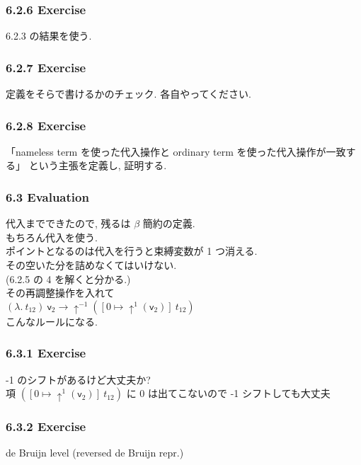 \documentclass[13pt,dvipdfm]{beamer}
\begin{document}
\frame
{
  \frametitle{6.2.6 Exercise}
  6.2.3 の結果を使う.
}

\frame
{
  \frametitle{6.2.7 Exercise}
  定義をそらで書けるかのチェック.
  各自やってください.
}

\frame
{
  \frametitle{6.2.8 Exercise}
  「nameless term を使った代入操作と ordinary term を使った代入操作が一致する」
  という主張を定義し, 証明する.

  
}

\frame
{
  \frametitle{6.3 Evaluation}
  代入までできたので, 残るは $\beta$ 簡約の定義.\\
  もちろん代入を使う.\\
  ポイントとなるのは代入を行うと束縛変数が 1 つ消える.\\
  その空いた分を詰めなくてはいけない.\\
  (6.2.5 の 4 を解くと分かる.)\\
  その再調整操作を入れて\\
  $(\lambda.\ t_{12})\ \mathsf{v}_2 \longrightarrow \uparrow^{-1} ([0 \mapsto \uparrow^{1} (\mathsf{v}_2)]\ t_{12})$\\
  こんなルールになる.
}

\frame
{
  \frametitle{6.3.1 Exercise}
  -1 のシフトがあるけど大丈夫か?\\
  項 $([0 \mapsto \uparrow^{1} (\mathsf{v}_2)]\ t_{12})$ に 0 は出てこないので -1 シフトしても大丈夫
}

\frame
{
  \frametitle{6.3.2 Exercise}
  de Bruijn level (reversed de Bruijn repr.)
  
}

\frame
{
  \frametitle{}

}
\end{document}
